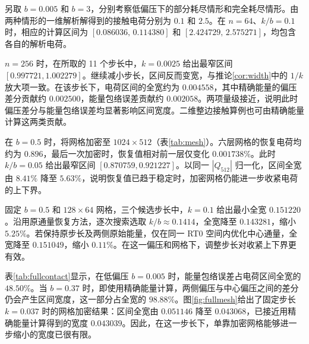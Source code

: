 另取 $b=0.005$ 和 $b=3$，分别考察低偏压下的部分耗尽情形和完全耗尽情形。由两种情形的一维解析解得到的接触电荷分别为 $0.1$ 和 $2.5$。在 $n=64$、$k/b=0.1$ 时，相应的计算区间为 $[0.086036,\,0.114380]$ 和 $[2.424729,\,2.575271]$，均包含各自的解析电荷。

$n=256$ 时，在所取的 11 个步长中，$k=0.0025$ 给出最窄区间 $[0.997721,1.002279]$。继续减小步长，区间反而变宽，与推论\ref{cor:width}中的 $1/k$ 放大项一致。在该步长下，电荷区间的全宽约为 $0.004558$，其中精确能量的偏压差分贡献约 $0.002500$，能量包络误差贡献约 $0.002058$。两项量级接近，说明此时偏压差分与能量包络误差均显著影响区间宽度。二维整边接触算例也可由精确能量计算这两类贡献。

在 $b=0.5$ 时，将网格加密至 $1024\times512$（表\ref{tab:mesh}）。六层网格的恢复电荷均约为 $0.896$，最后一次加密时，恢复值相对前一层仅变化 $0.001738\%$。此时 $k/b=0.05$ 给出最窄区间 $[0.870759,0.921227]$。以同一 $|Q_{512}|$ 归一化，区间全宽由 $8.41\%$ 降至 $5.63\%$，说明恢复值已趋于稳定时，加密网格仍能进一步收紧电荷的上下界。

固定 $b=0.5$ 和 $128\times64$ 网格，三个候选步长中，$k=0.1$ 给出最小全宽 $0.151220$。沿用原通量恢复方法，逐次搜索选取 $k/b\approx0.1414$，全宽降至 $0.143281$，缩小 $5.25\%$。若保持原步长及两侧原始能量，仅在同一 RT0 空间内优化中心通量，全宽降至 $0.151049$，缩小 $0.11\%$。在这一偏压和网格下，调整步长对收紧上下界更有效。

表\ref{tab:fullcontact}显示，在低偏压 $b=0.005$ 时，能量包络误差占电荷区间全宽的 $48.50\%$。当 $b=0.37$ 时，即使用精确能量计算，两侧偏压与中心偏压之间的差分仍会产生区间宽度，这一部分占全宽的 $98.88\%$。图\ref{fig:fullmesh}给出了固定步长 $k=0.037$ 时的网格加密结果：区间全宽由 $0.051146$ 降至 $0.043068$，已接近用精确能量计算得到的宽度 $0.043039$。因此，在这一步长下，单靠加密网格能够进一步缩小的宽度已很有限。
